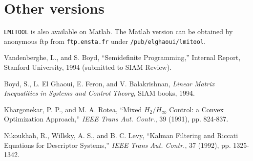 \documentclass{article}
\begin{document}
\section{Other versions}
{\tt LMITOOL} is also available on Matlab. The Matlab version can be
obtained by anonymous ftp from {\tt ftp.ensta.fr} under
{\tt /pub/elghaoui/lmitool}.

\newpage

\begin{thebibliography}{99}
 Vandenberghe, L., and S. Boyd, ``Semidefinite
Programming,'' Internal Report, Stanford University, 1994 (submitted
to SIAM Review).

 Boyd, S., L. El Ghaoui, E. Feron, and V. Balakrishnan,
{\em Linear Matrix Inequalities in Systems and Control Theory}, SIAM
books, 1994.

 Khargonekar, P. P., and M. A. Rotea, ``Mixed
$H_2/H_{\infty}$ Control: a Convex Optimization Approach,'' {\em IEEE
Trans Aut. Contr.}, 39 (1991), pp. 824-837.

 Nikoukhah, R., Willsky, A. S., and B. C. Levy,
``Kalman Filtering and Riccati Equations for Descriptor Systems,'' {\em IEEE
Trans Aut. Contr.}, 37 (1992), pp. 1325-1342.

\end{thebibliography}
\end{document}
